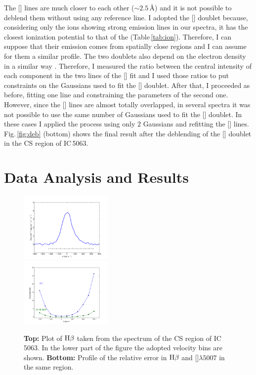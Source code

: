 \documentclass[../main.tex]{subfiles}
\begin{document}
The [] lines are much closer to each other ($\sim 2.5$\,\AA) and it is not possible to deblend them without using any reference line.
I adopted the [] doublet because, considering only the ions showing strong emission lines in our spectra, it has the closest ionization potential to that of the  (Table\,\ref{tab:ion}).
Therefore, I can suppose that their emission comes from spatially close regions and I can assume for them a similar profile.
The two doublets also depend on the electron density in a similar way \citep[see][]{OsterbrockAGN}.
Therefore, I measured the ratio between the central intensity of each component in the two lines of the [] fit and I used those ratios to put constraints on the Gaussians used to fit the [] doublet.
After that, I proceeded as before, fitting one line and constraining the parameters of the second one.
However, since the [] lines are almost totally overlapped, in several spectra it was not possible to use the same number of Gaussians used to fit the [] doublet.
In these cases I applied the process using only $2$ Gaussians and refitting the [] lines.
Fig.\,\ref{fig:deb} (bottom) shows the final result after the deblending of the [] doublet in the CS region of IC\,5063.


\section{Data Analysis and Results}
\label{sec:data_an}

\begin{figure}
\centering
\includegraphics[width=0.40\textwidth]{images/paper1/IC5063_bins.pdf} \\
\includegraphics[width=0.40\textwidth]{images/paper1/errors.pdf}
\caption[]{\textbf{Top:} Plot of $\rm H\beta$ taken from the spectrum of the CS region of IC\,5063. In the lower part of the figure the adopted velocity bins are shown. \textbf{Bottom:} Profile of the relative error in $\rm H\beta$ and []$\lambda5007$ in the same region.}
\label{fig:bins}
\end{figure}
\end{document}
